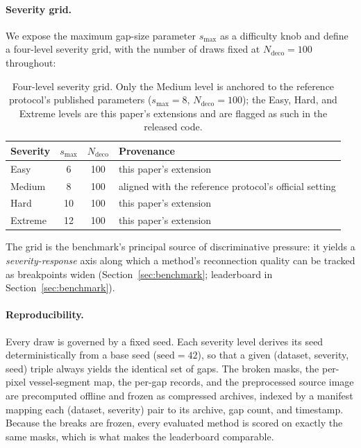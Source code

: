 \paragraph{Severity grid.} We expose the maximum gap-size parameter
$s_{\max}$ as a difficulty knob and define a four-level severity grid, with
the number of draws fixed at $N_{\mathrm{deco}} = 100$ throughout:

\begin{table}[t]
  \centering
  \begin{tabular}{lccl}
    \toprule
    Severity & $s_{\max}$ & $N_{\mathrm{deco}}$ & Provenance \\
    \midrule
    Easy    & 6  & 100 & this paper's extension \\
    Medium  & 8  & 100 & aligned with the reference protocol's official setting \\
    Hard    & 10 & 100 & this paper's extension \\
    Extreme & 12 & 100 & this paper's extension \\
    \bottomrule
  \end{tabular}
  \caption{Four-level severity grid. Only the Medium level is anchored to the
  reference protocol's published parameters ($s_{\max}=8$,
  $N_{\mathrm{deco}}=100$); the Easy, Hard, and Extreme levels are this
  paper's extensions and are flagged as such in the released code.}
  \label{tab:severity}
\end{table}

The grid is the benchmark's principal source of discriminative pressure: it
yields a \emph{severity-response} axis along which a method's reconnection
quality can be tracked as breakpoints widen
(Section~\ref{sec:benchmark}; leaderboard in Section~\ref{sec:benchmark}).

\paragraph{Reproducibility.} Every draw is governed by a fixed seed. Each
severity level derives its seed deterministically from a base seed
($\mathrm{seed} = 42$), so that a given (dataset, severity, seed) triple
always yields the identical set of gaps. The broken masks, the per-pixel
vessel-segment map, the per-gap records, and the preprocessed source image
are precomputed offline and frozen as compressed archives, indexed by a
manifest mapping each (dataset, severity) pair to its archive, gap count, and
timestamp. Because the breaks are frozen, every evaluated method is scored on
exactly the same masks, which is what makes the leaderboard comparable.

